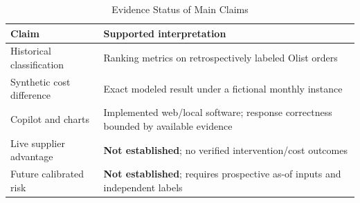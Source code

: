 \documentclass[conference,a4paper]{IEEEtran}
\begin{document}
\begin{table}[t]
\caption{Evidence Status of Main Claims}
\centering\footnotesize\setlength{\tabcolsep}{3pt}
\begin{tabular}{p{}p{}}
\toprule
Claim & Supported interpretation\\
\midrule
Historical classification & Ranking metrics on retrospectively labeled Olist orders\\
Synthetic cost difference & Exact modeled result under a fictional monthly instance\\
Copilot and charts & Implemented web/local software; response correctness bounded by available evidence\\
Live supplier advantage & \textbf{Not established}; no verified intervention/cost outcomes\\
Future calibrated risk & \textbf{Not established}; requires prospective as-of inputs and independent labels\\
\bottomrule
\end{tabular}
\label{tab:status}
\end{table}
\end{document}
